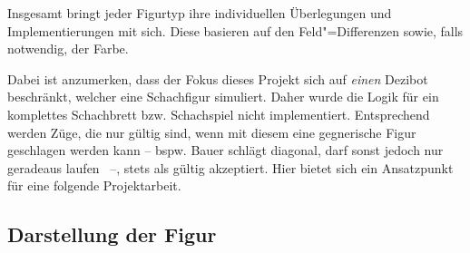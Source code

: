 
Insgesamt bringt jeder Figurtyp ihre individuellen Überlegungen und Implementierungen mit sich. Diese basieren auf den Feld"=Differenzen sowie, falls notwendig, der Farbe.


Dabei ist anzumerken, dass der Fokus dieses Projekt sich auf \emph{einen} Dezibot beschränkt, welcher eine Schachfigur simuliert. Daher wurde die Logik für ein komplettes Schachbrett bzw. Schachspiel nicht implementiert. Entsprechend werden Züge, die nur gültig sind, wenn mit diesem eine gegnerische Figur geschlagen werden kann -- bspw. Bauer schlägt diagonal, darf sonst jedoch nur geradeaus laufen~\cite{justUSChessFederations2019} --, stets als gültig akzeptiert. Hier bietet sich ein Ansatzpunkt für eine folgende Projektarbeit.


\subsection{Darstellung der Figur}
\label{sec:display-representation}

